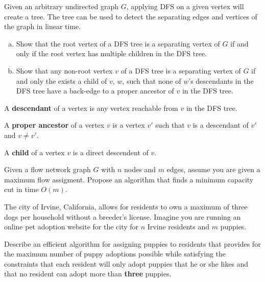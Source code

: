 \documentclass{common/cs157}
\begin{document}
\homeworkhandin

\begin{problem}{1}
Given an arbitrary undirected graph $G$, applying DFS on a given vertex will create a tree. The tree can be used to detect the separating edges and vertices of the graph in linear time.

\begin{enumerate}[(a)]
\item Show that the root vertex of a DFS tree is a separating vertex of $G$ if and only if the root vertex has multiple children in the DFS tree.

\item Show that any non-root vertex $v$ of a DFS tree is a separating vertex of $G$ if and only the exists a child of $v$, $w$, such that none of $w$'s descendants in the DFS tree have a back-edge to a proper ancestor of $v$ in the DFS tree.
\end{enumerate}

A \textbf{descendant} of a vertex is any vertex reachable from $v$ in the DFS tree.

A \textbf{proper ancestor} of a vertex $v$ is a vertex $v'$ such that $v$ is a descendant of $v'$ and $v \neq v'$.

A \textbf{child} of a vertex $v$ is a direct descendent of $v$.
\end{problem}
\newpage

\begin{problem}{2}
Given a flow network graph $G$ with $n$ nodes and $m$ edges, assume you are given a maximum flow assigment. Propose an algorithm that finds a minimum capacity cut in time $O(m)$.

\end{problem}
\newpage

\begin{problem}{3}
The city of Irvine, California, allows for residents to own a maximum of three
dogs per household without a breeder’s license. Imagine you are running an
online pet adoption website for the city for $n$ Irvine residents and $m$ puppies. 

Describe an efficient algorithm for assigning puppies to residents that provides for the maximum number of puppy adoptions possible while satisfying the constraints that each resident will only adopt puppies that he or she likes and that no resident can adopt more than \textbf{three} puppies.
\end{problem}
\end{document}
